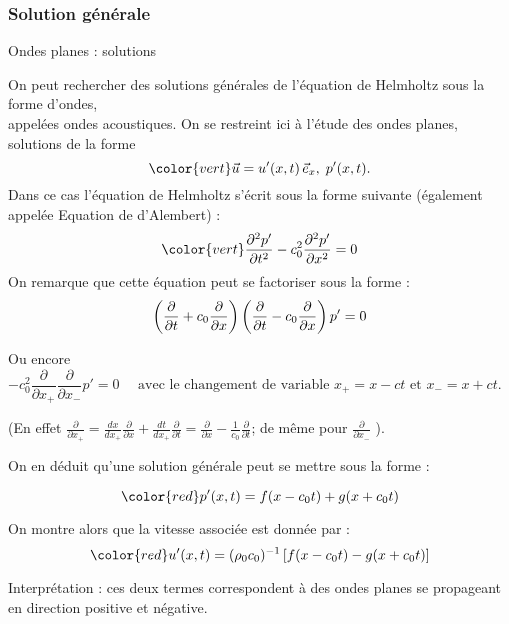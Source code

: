 \subsubsection{Solution générale}
\begin{frame}{Ondes planes : solutions}

\small
On peut rechercher des solutions générales de l'équation de Helmholtz sous la forme d'ondes, \\
appelées ondes acoustiques.
On se restreint ici à l'étude des ondes \textcolor{vert}{planes}, solutions de la forme
\[ \color{vert}
	\myvec{u} = u'(x, t) \, \vec{e}_x, \; p'(x, t).
\]
Dans ce cas l'équation de Helmholtz s'écrit sous la forme suivante (également appelée Equation de d'Alembert) :
\begin{equation}
	\color{vert}
		\ddpdt{p'} - c_0^2 \ddpdx{ p'} = 0 
\end{equation}
\pause
On remarque que cette équation peut se factoriser sous la forme :
\[
	\left (\displaystyle \frac{\partial }{\partial t} + c_0\displaystyle \frac{\partial }{\partial x}\right ) \left (\displaystyle \frac{\partial }{\partial t} - c_0\displaystyle \frac{\partial }{\partial x} \right) p'
=
	0
\]
\pause

Ou encore 
\[
- c_0^2 \frac{\partial }{\partial x_+} \frac{\partial }{\partial x_-} p' = 0
\quad \mbox{ avec le changement de variable } x_+ = x-ct \mbox{ et } x_- = x+ct. \quad 
\]



\textcolor{gris}{\small (En effet 
$\frac{\partial}{\partial x_+} = \frac{dx}{dx_+} \frac{\partial}{\partial x} + \frac{dt}{dx_+} 
\frac{\partial}{\partial t}  = 
\frac{\partial}{\partial x} - \frac{1}{c_0} \frac{\partial}{\partial t}$; de même pour $ \frac{\partial}{\partial x_-}$ ).}

\smallskip
On en déduit qu'une solution générale peut se mettre sous la forme :


\[ \color{red}
	p'(x, t) =   f(x-c_0 t) + g(x+c_0 t)
\]

On montre alors que la vitesse associée est donnée par :
\[ \color{red}
	u'(x, t) = (\rho_0 c_0)^{-1} \left[  f(x-c_0 t) - g(x+c_0 t) \right]
\]


Interprétation : ces deux termes correspondent à des ondes planes se propageant en direction positive et négative.



\vspace{0mm}



\end{frame}

